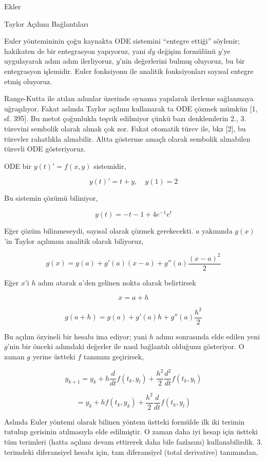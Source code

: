\documentclass[12pt,fleqn]{article}\usepackage{../../common}
\begin{document}
Ekler

Taylor Açılımı Bağlantıları

Euler yöntemininin çoğu kaynakta ODE sistemini ``entegre ettiği'' söylenir;
hakikaten de bir entegrasyon yapıyoruz, yani $dy$ değişim formülünü $y$'ye
uygulayarak adım adım ilerliyoruz, $y$'nin değerlerini bulmuş oluyoruz, bu
bir entegrasyon işlemidir. Euler fonksiyonu ile analitik fonksiyonları
sayısal entegre etmiş oluyoruz.

Range-Kutta ile atılan adımlar üzerinde oynama yapılarak ilerleme sağlanmaya
uğraşılıyor. Fakat aslında Taylor açılımı kullanarak ta ODE çözmek mümkün [1,
  sf. 395]. Bu metot çoğunlukla teşvik edilmiyor çünkü bazı denklemlerin 2.,
3. türevini sembolik olarak almak çok zor. Fakat otomatik türev ile, bkz [2], bu
türevler rahatlıkla alınabilir. Altta gösterme amaçlı olarak sembolik alınabilen
türevli ODE gösteriyoruz.

ODE bir $y(t)' = f(x,y)$ sistemidir, 

$$ y(t)' = t + y , \quad y(1) = 2$$

Bu sistemin çözümü biliniyor, 

$$ y(t) = -t -1 + 4e^{-1}e^t$$

Eğer çözüm bilinmeseydi, sayısal olarak çözmek gerekecekti. $a$ yakınında
$g(x)$'in Taylor açılımını analitik olarak biliyoruz,

$$ g(x) = g(a) + g'(a)(x-a) + g''(a) \frac{(x-a)^2}{2}$$

Eğer $x$'i $h$ adım atarak $a$'den gelinen nokta olarak belirtirsek

$$ x=a+h$$

$$ g(a+h) = g(a) + g'(a)h + g''(a)\frac{h^2}{2}$$

Bu açılım özyineli bir hesabı ima ediyor; yani $h$ adımı sonrasında elde
edilen yeni $g$'nin bir önceki adımdaki değerler ile nasıl bağlantılı
olduğunu gösteriyor. O zaman $g$ yerine üstteki $f$ tanımını geçirirsek,

$$ y_{k+1} = y_k + h \frac{d}{dt} f(t_k,y_l) + \frac{h^2}{2} \frac{d^2}{dt} f(t_k,y_l)$$

$$  = y_k + hf(t_k,y_k) + \frac{h^2}{2} \frac{d}{dt} f(t_k,y_l)$$

Aslında Euler yöntemi olarak bilinen yöntem üstteki formülde ilk iki
terimin tutulup gerisinin atılmasıyla elde edilmiştir. O zaman daha iyi
hesap için üstteki tüm terimleri (hatta açılımı devam ettirerek daha bile
fazlasını) kullanabilirdik. 3. terimdeki diferansiyel hesabı için, tam
diferansiyel (total derivative) tanımından,
\end{document}
